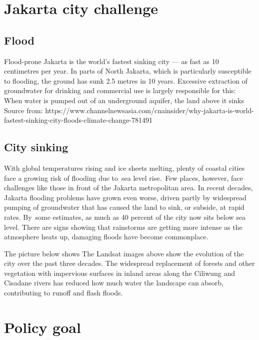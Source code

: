 \documentclass[
  letterpaper,
  DIV=11,
  numbers=noendperiod]{scrreprt}
\begin{document}
\chapter{Jakarta city challenge}\label{jakarta-city-challenge}

\section{Flood}\label{flood}

Flood-prone Jakarta is the world's fastest sinking city --- as fast as
10 centimetres per year. In parts of North Jakarta, which is
particularly susceptible to flooding, the ground has sunk 2.5 metres in
10 years. Excessive extraction of groundwater for drinking and
commercial use is largely responsible for this: When water is pumped out
of an underground aquifer, the land above it sinks Source from:
https://www.channelnewsasia.com/cnainsider/why-jakarta-is-world-fastest-sinking-city-floods-climate-change-781491

\section{City sinking}\label{city-sinking}

With global temperatures rising and ice sheets melting, plenty of
coastal cities face a growing risk of flooding due to~sea level
rise.~Few places, however, face challenges like those in front of the
Jakarta metropolitan area. In recent decades, Jakarta flooding problems
have grown even worse, driven partly by widespread pumping of
groundwater that has caused the land to sink, or subside, at rapid
rates. By~some estimates, as much as 40 percent of the city now sits
below sea level. There are signs showing that rainstorms are getting
more intense as the atmosphere heats up, damaging floods have become
commonplace.

The picture below shows The Landsat images above show the evolution of
the city over the past three decades. The widespread replacement of
forests and other vegetation with impervious surfaces in inland areas
along the Ciliwung and Cisadane rivers has reduced how much water the
landscape can absorb, contributing to runoff and flash floods.


\chapter{Policy goal}\label{policy-goal}
\end{document}
